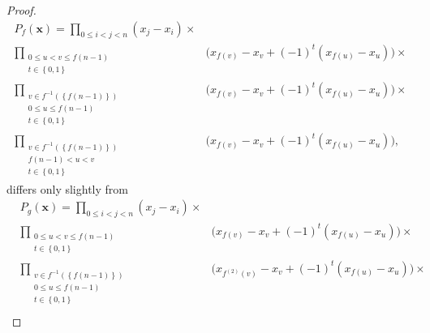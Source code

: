\begin{proof}
\begin{equation}\label{eq:Pf_broken}
\begin{array}{cc}
P_{f}\left(\mathbf{x}\right)=\underset{0\le i<j<n}{\prod}\left(x_{j}-x_{i}\right)\times\\
\underset{\begin{array}{c}
0\le u<v\le f\left(n-1\right)\\
t\in\left\{ 0,1\right\} 
\end{array}}{\prod} & \bigg(x_{f\left(v\right)}-x_{v}+\left(-1\right)^{t}(x_{f\left(u\right)}-x_{u})\bigg)\times\\
\underset{\begin{array}{c}
v\in f^{-1}\left(\left\{ f\left(n-1\right)\right\} \right)\\
0\le u\le f\left(n-1\right)\\
t\in\left\{ 0,1\right\} 
\end{array}}{\prod} & \bigg(x_{f\left(v\right)}-x_{v}+\left(-1\right)^{t}(x_{f\left(u\right)}-x_{u})\bigg)\times\\
\underset{\begin{array}{c}
v\in f^{-1}\left(\left\{ f\left(n-1\right)\right\} \right)\\
f\left(n-1\right)<u<v\\
t\in\left\{ 0,1\right\} 
\end{array}}{\prod} & \bigg(x_{f\left(v\right)}-x_{v}+\left(-1\right)^{t}(x_{f\left(u\right)}-x_{u})\bigg),
\end{array}
\end{equation}
differs only slightly from
\begin{equation}\label{eq:Pg_broken}
\begin{array}{ccc}
 & P_{g}\left(\mathbf{x}\right)=\underset{0\le i<j<n}{\prod}\left(x_{j}-x_{i}\right)\times\\
 & \underset{\begin{array}{c}
0\le u<v\le f\left(n-1\right)\\
t\in\left\{ 0,1\right\} 
\end{array}}{\prod} & \bigg(x_{f\left(v\right)}-x_{v}+\left(-1\right)^{t}(x_{f\left(u\right)}-x_{u})\bigg)\times\\
 & \underset{\begin{array}{c}
v\in f^{-1}\left(\left\{ f\left(n-1\right)\right\} \right)\\
0\le u\le f\left(n-1\right)\\
t\in\left\{ 0,1\right\} 
\end{array}}{\prod} & \bigg(x_{f^{\left(2\right)}\left(v\right)}-x_{v}+\left(-1\right)^{t}(x_{f\left(u\right)}-x_{u})\bigg)\times\\

\end{array}
\end{equation}
\end{proof}
